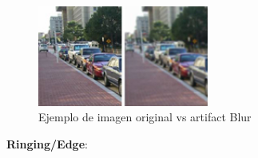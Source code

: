 \begin{figure}[htb]
\begin{center}
       \includegraphics[width=0.5\textwidth]{imagenes/blur_example.jpg}
       \caption{Ejemplo de imagen original vs artifact Blur}
       \end{center}

\end{figure}


\textbf{Ringing/Edge}:\\

